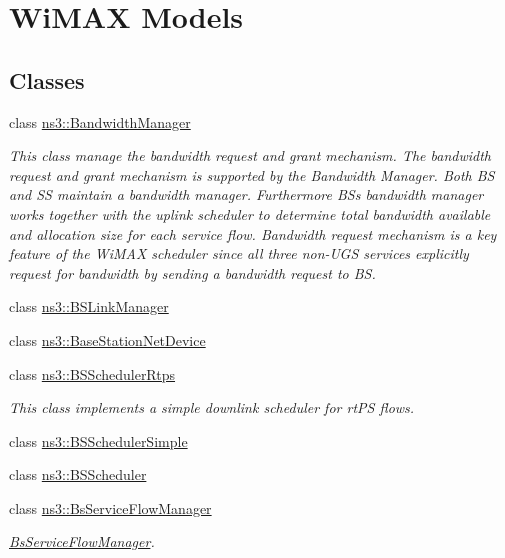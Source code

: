 \hypertarget{group__wimax}{}\section{Wi\+M\+AX Models}
\label{group__wimax}
\subsection*{Classes}
\begin{DoxyCompactItemize}
\item 
class \hyperlink{classns3_1_1BandwidthManager}{ns3\+::\+Bandwidth\+Manager}
\begin{DoxyCompactList}\small\item\em This class manage the bandwidth request and grant mechanism. The bandwidth request and grant mechanism is supported by the Bandwidth Manager. Both BS and SS maintain a bandwidth manager. Furthermore BS\textquotesingle{}s bandwidth manager works together with the uplink scheduler to determine total bandwidth available and allocation size for each service flow. Bandwidth request mechanism is a key feature of the Wi\+M\+AX scheduler since all three non-\/\+U\+GS services explicitly request for bandwidth by sending a bandwidth request to BS. \end{DoxyCompactList}\item 
class \hyperlink{classns3_1_1BSLinkManager}{ns3\+::\+B\+S\+Link\+Manager}
\item 
class \hyperlink{classns3_1_1BaseStationNetDevice}{ns3\+::\+Base\+Station\+Net\+Device}
\item 
class \hyperlink{classns3_1_1BSSchedulerRtps}{ns3\+::\+B\+S\+Scheduler\+Rtps}
\begin{DoxyCompactList}\small\item\em This class implements a simple downlink scheduler for rt\+PS flows. \end{DoxyCompactList}\item 
class \hyperlink{classns3_1_1BSSchedulerSimple}{ns3\+::\+B\+S\+Scheduler\+Simple}
\item 
class \hyperlink{classns3_1_1BSScheduler}{ns3\+::\+B\+S\+Scheduler}
\item 
class \hyperlink{classns3_1_1BsServiceFlowManager}{ns3\+::\+Bs\+Service\+Flow\+Manager}
\begin{DoxyCompactList}\small\item\em \hyperlink{classns3_1_1BsServiceFlowManager}{Bs\+Service\+Flow\+Manager}. \end{DoxyCompactList}\item 

\end{DoxyCompactItemize}
